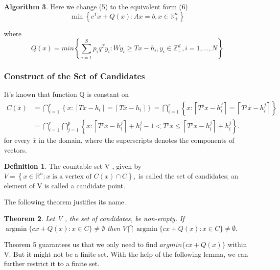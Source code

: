 \documentclass{article}
\theoremstyle{plain}
\newtheorem{theorem}{Theorem}[section]
\theoremstyle{definition}
\newtheorem{definition}[theorem]{Definition}
\newtheorem{algorithm}[theorem]{Algorithm}
\begin{document}
\begin{algorithm}
Here we change (5) to the equivalent form (6)
\begin{equation}
\min \left\{c^{T} x+Q(x): Ax=b, x\in \mathbb{R}_{+}^{n}\right\}
\end{equation}

where
\begin{equation}
Q(x)=min\left \{
\sum_{i=1}^{S} p_{i} q^{T} y_{i}: W y_{i}\geq T x - h_{i}, y_{i}  \in \mathbb{Z}_{+}^{d}, i=1, \ldots, N\right\}
\end{equation}

\subsubsection{Construct of the Set of Candidates }

It's known that function  Q  is constant on 
$$
\begin{aligned}
C(\bar{x}) &=\bigcap_{i=1}^{r}\left\{x:\left\lceil T x-h_{i}\right\rceil=\left\lceil T \bar{x}-h_{i}\right\rceil\right\}=\bigcap_{i=1}^{r}\left\{x:\left\lceil T^{j} x-h^{j}_{i}\right\rceil=\left\lceil T^{j} \bar{x}-h^{j}_{i}\right\rceil\right\} \\
&=\bigcap_{i=1}^{r} \bigcap_{j=1}^{p}\left\{x:\left\lceil T^{j} \bar{x}-h^{j}_{i}\right\rceil+h^{j}_{i}-1<T^{j} x \leqslant\left\lceil T^{j} \bar{x}-h^{j}_{i}\right\rceil+h^{j}_{i}\right\} .
\end{aligned}
$$for every $\bar{x}$ in the domain, where the superscripts denotes the components of vectors. \\

\begin{definition} The countable set  V , given by $V=\left\{x \in \mathbb{R}^{n}: x \text { is a vertex of } C(x) \cap C\right\},$ is called the set of candidates; an element of  V  is called a candidate point. 
\end{definition}

The following theorem justifies its name. 

\begin{theorem}Let  V , the set of candidates, be non-empty. If  $\operatorname{argmin}\{c x+Q(x): x \in C\} \neq \emptyset$  then  $V \bigcap \operatorname{argmin}\{c x+Q(x): x \in C\} \neq \emptyset$.  
\end{theorem}

Theorem 5 guarantees us that we only need to find $argmin\{cx+Q(x)\}$ within V. But it might not be a finite set. With the help of the following lemma, we can further restrict it to a finite set. 


\end{algorithm}
\end{document}
